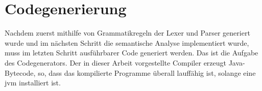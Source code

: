 \chapter{Codegenerierung}
Nachdem zuerst mithilfe von Grammatikregeln der Lexer und Parser generiert wurde und im nächsten Schritt die semantische Analyse implementiert wurde, muss im letzten Schritt ausführbarer Code generiert werden. Das ist die Aufgabe des Codegenerators. Der in dieser Arbeit vorgestellte Compiler erzeugt Java-Bytecode, so, dass das kompilierte Programme überall lauffähig ist, solange eine \ac{jvm} installiert ist.



